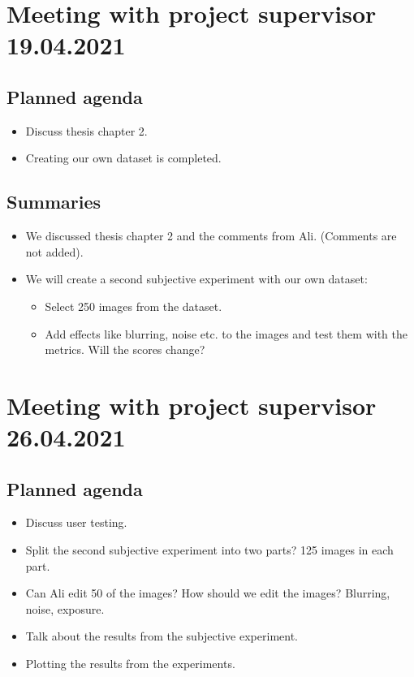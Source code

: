 \section*{Meeting with project supervisor 19.04.2021}
\subsection*{Planned agenda}
\begin{itemize}
    \item Discuss thesis chapter 2.
    \item Creating our own dataset is completed.
\end{itemize}

\subsection*{Summaries}
\begin{itemize}
    \item We discussed thesis chapter 2 and the comments from Ali. (Comments are not added).
    \item We will create a second subjective experiment with our own dataset:
    \begin{itemize}
        \item Select 250 images from the dataset.
        \item Add effects like blurring, noise etc. to the images and test them with the metrics. Will the scores change?
    \end{itemize}
\end{itemize}



\section*{Meeting with project supervisor 26.04.2021}
\subsection*{Planned agenda}
\begin{itemize}
    \item Discuss user testing.
    \item Split the second subjective experiment into two parts? 125 images in each part.
    \item Can Ali edit 50 of the images? How should we edit the images? Blurring, noise, exposure.
    \item Talk about the results from the subjective experiment.
    \item Plotting the results from the experiments.
\end{itemize}

